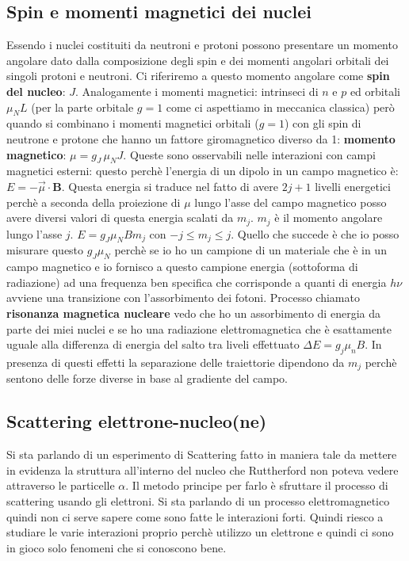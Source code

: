 \subsection{Spin e momenti magnetici dei nuclei}
Essendo i nuclei costituiti da neutroni e protoni possono presentare un momento angolare dato dalla composizione degli spin e dei momenti angolari orbitali dei singoli protoni e neutroni. Ci riferiremo a questo momento angolare come \textbf{spin del nucleo}: $J$. Analogamente i momenti magnetici: intrinseci di $n$ e $p$ ed orbitali $\mu_N L$ (per la parte orbitale $g=1$ come ci aspettiamo in meccanica classica) però quando si combinano i momenti magnetici orbitali ($g=1$) con gli spin di neutrone e protone che hanno un fattore giromagnetico diverso da 1: \textbf{momento magnetico}: $\mu=g_J\,\mu_NJ$. Queste sono osservabili nelle interazioni con campi magnetici esterni: questo perchè l'energia di un dipolo in un campo magnetico è: $E=-\Vec{\mu}\cdot \mathbf{B}$. Questa energia si traduce nel fatto di avere $2j+1$ livelli energetici perchè a seconda della proiezione di $\mu$ lungo l'asse del campo magnetico posso avere diversi valori di questa energia scalati da $m_j$. $m_j$ è il momento angolare lungo l'asse $j$. $E=g_J\mu_NBm_j$ con $-j\le m_j\le j$. Quello che succede è che io posso misurare questo $g_J\mu_N$ perchè se io ho un campione di un materiale che è in un campo magnetico e io fornisco a questo campione energia (sottoforma di radiazione) ad una frequenza ben specifica che corrisponde a quanti di energia $h\nu$ avviene una transizione con l'assorbimento dei fotoni. Processo chiamato \textbf{risonanza magnetica nucleare} vedo che ho un assorbimento di energia da parte dei miei nuclei e se ho una radiazione elettromagnetica che è esattamente uguale alla differenza di energia del salto tra liveli effettuato $\Delta E=g_j\mu_nB$. In presenza di questi effetti la separazione delle traiettorie dipendono da $m_j$ perchè sentono delle forze diverse in base al gradiente del campo. 
\subsection{Scattering elettrone-nucleo(ne)}
Si sta parlando di un esperimento di Scattering fatto in maniera tale da mettere in evidenza la struttura all'interno del nucleo che Ruttherford non poteva vedere attraverso le particelle $\alpha$. Il metodo principe per farlo è sfruttare il processo di scattering usando gli elettroni. Si sta parlando di un processo elettromagnetico quindi non ci serve sapere come sono fatte le interazioni forti. Quindi riesco a studiare le varie interazioni proprio perchè utilizzo un elettrone e quindi ci sono in gioco solo fenomeni che si conoscono bene. 
